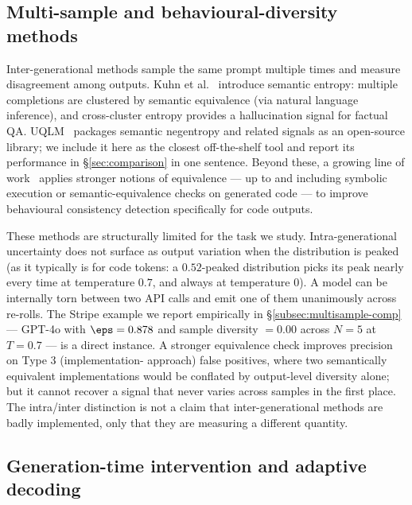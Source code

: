 \subsection{Multi-sample and behavioural-diversity methods}
\label{subsec:related-multisample}

Inter-generational methods sample the same prompt multiple times and
measure disagreement among outputs. Kuhn et al.~\cite{kuhn2023semantic}
introduce semantic entropy: multiple completions are clustered by
semantic equivalence (via natural language inference), and cross-cluster
entropy provides a hallucination signal for factual QA. UQLM~\cite{uqlm2024}
packages semantic negentropy and related signals as an open-source
library; we include it here as the closest off-the-shelf tool and report
its performance in \S\ref{sec:comparison} in one sentence. Beyond these,
a growing line of work~\cite{sharma2025multisample} applies stronger
notions of equivalence --- up to and including symbolic execution or
semantic-equivalence checks on generated code --- to improve behavioural
consistency detection specifically for code outputs.

These methods are structurally limited for the task we study.
Intra-generational uncertainty does not surface as output variation when
the distribution is peaked (as it typically is for code tokens: a
$0.52$-peaked distribution picks its peak nearly every time at temperature
$0.7$, and always at temperature $0$). A model can be internally torn
between two API calls and emit one of them unanimously across re-rolls.
The Stripe example we report empirically in
\S\ref{subsec:multisample-comp} --- GPT-4o with $\eps=0.878$ and sample
diversity $=0.00$ across $N=5$ at $T=0.7$ --- is a direct instance. A
stronger equivalence check improves precision on Type 3 (implementation-%
approach) false positives, where two semantically equivalent
implementations would be conflated by output-level diversity alone; but
it cannot recover a signal that never varies across samples in the first
place. The intra/inter distinction is not a claim that inter-generational
methods are badly implemented, only that they are measuring a different
quantity.

\subsection{Generation-time intervention and adaptive decoding}
\label{subsec:related-adadec}

